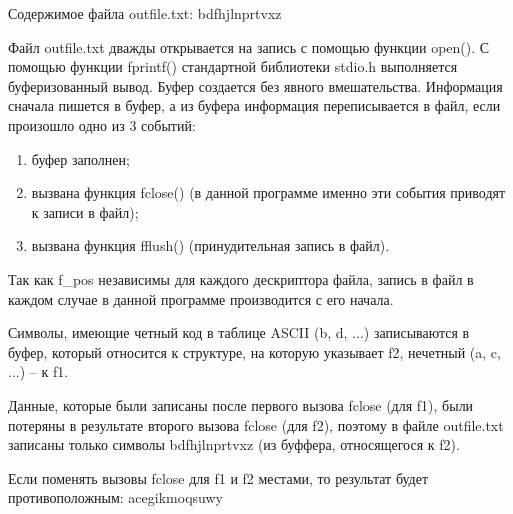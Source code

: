 \documentclass[12pt]{report}
\begin{document}
Содержимое файла outfile.txt: bdfhjlnprtvxz

Файл outfile.txt дважды открывается на запись с помощью функции open(). 
С помощью функции fprintf() стандартной библиотеки stdio.h выполняется буферизованный вывод. Буфер создается без явного вмешательства. Информация сначала пишется в буфер, а из буфера информация переписывается в файл, если произошло одно из 3 событий:

\begin{enumerate}
	\item буфер заполнен;
	\item вызвана функция fclose() (в данной программе именно эти события приводят к записи в файл);
	\item вызвана функция fflush() (принудительная запись в файл).
\end{enumerate}

Так как f\_pos независимы для каждого дескриптора файла, запись в файл в каждом случае  в данной программе производится с его начала.

Символы, имеющие четный код в таблице ASCII  (b, d, ...) записываются в буфер, который относится к структуре, на которую указывает f2, нечетный (a, c, ...) -- к f1. 

Данные, которые были записаны после первого вызова fclose (для f1), были потеряны в результате второго вызова fclose (для f2), поэтому в файле outfile.txt записаны только символы bdfhjlnprtvxz (из буффера, относящегося к f2).

Если поменять вызовы fclose для f1 и f2 местами, то результат будет противоположным: acegikmoqsuwy
\end{document}
